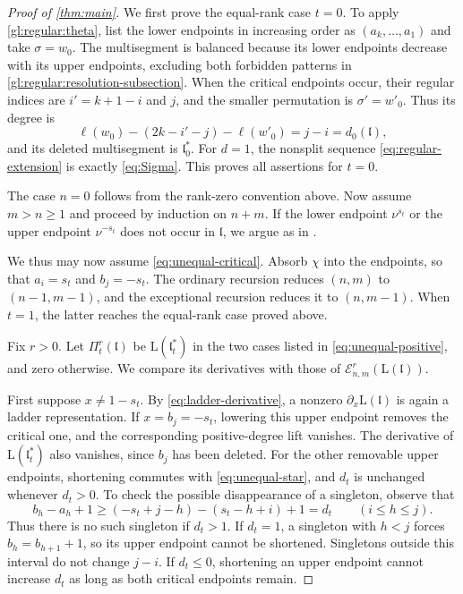 \documentclass[10pt,a4paper]{article}
\theoremstyle{definition}
\theoremstyle{remark}
\numberwithin{equation}{section}
\newcommand{\fl}{\mathfrak{l}}
\newcommand{\Lrep}{\mathrm{L}}
\newcommand{\cE}{\mathcal{E}}
\begin{document}
\begin{proof}[Proof of \cref{thm:main}]
We first prove the equal-rank case $t=0$.
To apply \cref{gl:regular:theta}, list the lower endpoints in
increasing order as $(a_k,\ldots,a_1)$ and take $\sigma=w_0$.
The multisegment is balanced because its lower
endpoints decrease with its upper endpoints, excluding both forbidden
patterns in \cref{gl:regular:resolution-subsection}.
When the critical endpoints occur, their regular indices are
$i'=k+1-i$ and $j$, and the smaller permutation is $\sigma'=w'_0$.
Thus its degree is
\[
 \ell(w_0)-(2k-i'-j)-\ell(w'_0)=j-i=d_0(\fl),
\]
and its deleted multisegment is $\fl_0^*$.
For $d=1$, the nonsplit sequence \eqref{eq:regular-extension}
is exactly \eqref{eq:Sigma}. This proves all assertions for $t=0$.

The case $n=0$ follows from the rank-zero convention above.
Now assume $m>n\geq1$ and proceed by induction on $n+m$.
If the lower
endpoint $\nu^{s_t}$ or the upper endpoint $\nu^{-s_t}$ does not occur in $\fl$, we argue as in
\cite[Proposition~4.1]{CLLTZ2025}.

We thus may now assume \eqref{eq:unequal-critical}. Absorb $\chi$ into
the endpoints, so that $a_i=s_t$ and $b_j=-s_t$.
The ordinary recursion reduces $(n,m)$ to $(n-1,m-1)$, and the
exceptional recursion reduces it to $(n,m-1)$.
When $t=1$, the latter reaches the equal-rank case proved above.

Fix $r>0$. Let $\Pi^r_t(\fl)$ be $\Lrep(\fl_t^*)$ in the two cases
listed in \eqref{eq:unequal-positive}, and zero otherwise. We compare
its derivatives with those of $\cE^r_{n,m}(\Lrep(\fl))$.

First suppose $x\ne1-s_t$. By \eqref{eq:ladder-derivative}, a nonzero
$\partial_x\Lrep(\fl)$ is again a ladder representation. If
$x=b_j=-s_t$, lowering this upper endpoint removes the critical one,
and the corresponding positive-degree lift vanishes. The derivative of
$\Lrep(\fl_t^*)$ also vanishes, since $b_j$ has been deleted.
For the other removable upper endpoints, shortening commutes with
\eqref{eq:unequal-star}, and $d_t$ is unchanged whenever $d_t>0$.
To check the possible disappearance of a singleton, observe that
\[
 b_h-a_h+1\geq(-s_t+j-h)-(s_t-h+i)+1=d_t
 \qquad(i\leq h\leq j).
\]
Thus there is no such singleton if $d_t>1$. If $d_t=1$, a singleton
with $h<j$ forces $b_h=b_{h+1}+1$, so its upper endpoint cannot be shortened.
Singletons outside this interval do not change $j-i$. If $d_t\leq0$,
shortening an upper endpoint cannot increase $d_t$ as long as both critical
endpoints remain.


\end{proof}
\end{document}
